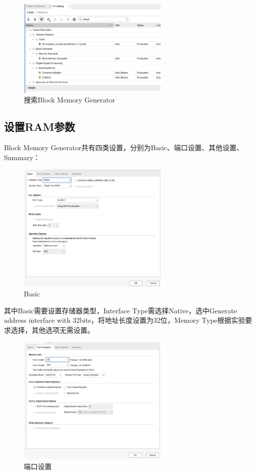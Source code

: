 \begin{figure}[htbp]
    \centering
    \includegraphics[width = 0.65\textwidth]{image/2_section/section_2_2.png}
    \caption{搜索Block Memory Generator}
    \label{fig:section_2_2}
\end{figure}

\subsection{设置RAM参数}
Block Memory Generator共有四类设置，分别为Basic、端口设置、其他设置、Summary：
\begin{figure}[htbp]
    \centering
    \includegraphics[width = 0.65\textwidth]{image/2_section/section_2_3.png}
    \caption{Basic}
    \label{fig:section_2_3}
\end{figure}

其中Basic需要设置存储器类型，Interface Type需选择Native，选中Generate address interface with 32bits，将地址长度设置为32位，Memory Type根据实验要求选择，其他选项无需设置。

\begin{figure}[htbp]
    \centering
    \includegraphics[width = 0.65\textwidth]{image/2_section/section_2_4.png}
    \caption{端口设置}
    \label{fig:section_2_4}
\end{figure}

